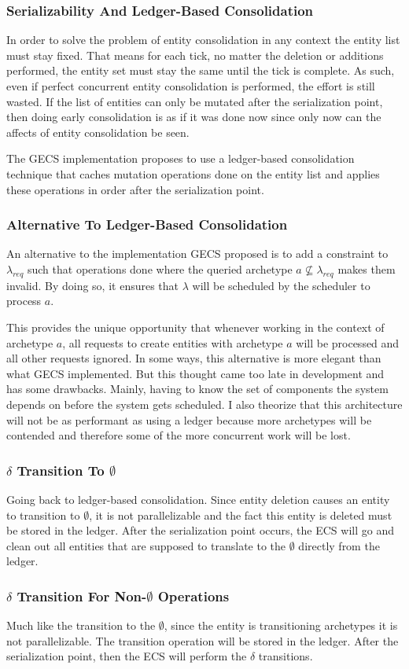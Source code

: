 \subsubsection{Serializability And Ledger-Based Consolidation}
\label{sec:ledger}
In order to solve the problem of entity consolidation in any context the entity list must stay fixed. That means for each tick, no matter the deletion or additions performed, the entity set must stay the same until the tick is complete. As such, even if perfect concurrent entity consolidation is performed, the effort is still wasted. If the list of entities can only be mutated after the serialization point, then doing early consolidation is as if it was done now since only now can the affects of entity consolidation be seen. 

The GECS implementation proposes to use a ledger-based consolidation technique that caches mutation operations done on the entity list and applies these operations in order after the serialization point.

\subsubsection{Alternative To Ledger-Based Consolidation}
An alternative to the implementation GECS proposed is to add a constraint to $\lambda_{req}$ such that operations done where the queried archetype $a \not\subseteq \lambda_{req}$ makes them invalid. By doing so, it ensures that $\lambda$ will be scheduled by the scheduler to process $a$. 

This provides the unique opportunity that whenever working in the context of archetype $a$, all requests to create entities with archetype $a$ will be processed and all other requests ignored. In some ways, this alternative is more elegant than what GECS implemented. But this thought came too late in development and has some drawbacks. Mainly, having to know the set of components the system depends on before the system gets scheduled. I also theorize that this architecture will not be as performant as using a ledger because more archetypes will be contended and therefore some of the more concurrent work will be lost.

\subsubsection{$\delta$ Transition To $\emptyset$}
Going back to ledger-based consolidation. Since entity deletion causes an entity to transition to $\emptyset$, it is not parallelizable and the fact this entity is deleted must be stored in the ledger. After the serialization point occurs, the ECS will go and clean out all entities that are supposed to translate to the $\emptyset$ directly from the ledger. 

\subsubsection{$\delta$ Transition For Non-$\emptyset$ Operations}
Much like the transition to the $\emptyset$, since the entity is transitioning archetypes it is not parallelizable. The transition operation will be stored in the ledger. After the serialization point, then the ECS will perform the $\delta$ transitions. 
